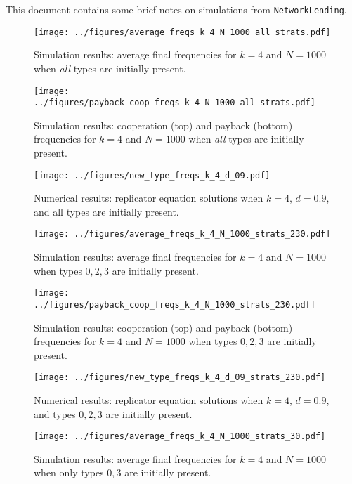 \documentclass[13pt]{amsart}
\begin{document}
This document contains some brief notes on simulations from \texttt{NetworkLending}.

\clearpage

\begin{figure}
    \texttt{[image: ../figures/average\_freqs\_k\_4\_N\_1000\_all\_strats.pdf]}
    \caption{Simulation results: average final frequencies for $k = 4$ and $N = 1000$ when \emph{all} types are initially present.}
\end{figure}

\begin{figure}
    \texttt{[image: ../figures/payback\_coop\_freqs\_k\_4\_N\_1000\_all\_strats.pdf]}
    \caption{Simulation results: cooperation (top) and payback (bottom) frequencies for $k = 4$ and $N = 1000$ when \emph{all} types are initially present.}
\end{figure}

\begin{figure}
    \texttt{[image: ../figures/new\_type\_freqs\_k\_4\_d\_09.pdf]}
    \caption{Numerical results: replicator equation solutions when $k = 4$, $d = 0.9$, and all types are initially present.}
\end{figure}

\begin{figure}
    \texttt{[image: ../figures/average\_freqs\_k\_4\_N\_1000\_strats\_230.pdf]}
    \caption{Simulation results: average final frequencies for $k = 4$ and $N = 1000$ when types $0, 2, 3$ are initially present.}
\end{figure}

\begin{figure}
    \texttt{[image: ../figures/payback\_coop\_freqs\_k\_4\_N\_1000\_strats\_230.pdf]}
    \caption{Simulation results: cooperation (top) and payback (bottom) frequencies for $k = 4$ and $N = 1000$ when types $0, 2, 3$ are initially present.}
\end{figure}

\begin{figure}
    \texttt{[image: ../figures/new\_type\_freqs\_k\_4\_d\_09\_strats\_230.pdf]}
    \caption{Numerical results: replicator equation solutions when $k = 4$, $d = 0.9$, and types $0, 2, 3$ are initially present.}
\end{figure}

\begin{figure}
    \texttt{[image: ../figures/average\_freqs\_k\_4\_N\_1000\_strats\_30.pdf]}
    \caption{Simulation results: average final frequencies for $k = 4$ and $N = 1000$ when only types $0, 3$ are initially present.}
\end{figure}
\end{document}
